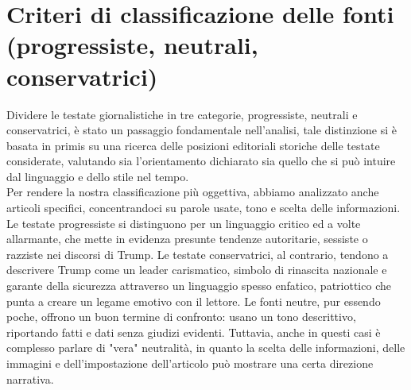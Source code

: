 \section{Criteri di classificazione delle fonti (progressiste, neutrali, conservatrici)}
Dividere le testate giornalistiche in tre categorie, progressiste, neutrali e conservatrici, è stato un passaggio fondamentale nell’analisi, tale distinzione si è basata in primis su una ricerca delle posizioni editoriali storiche delle testate considerate, valutando sia l’orientamento dichiarato sia quello che si può intuire dal linguaggio e dello stile nel tempo. \\
Per rendere la nostra classificazione più oggettiva, abbiamo analizzato anche articoli specifici, concentrandoci su parole usate, tono e scelta delle informazioni.\\
Le testate progressiste si distinguono per un linguaggio critico ed a volte allarmante, che mette in evidenza presunte tendenze autoritarie, sessiste o razziste nei discorsi di Trump. Le testate conservatrici, al contrario, tendono a descrivere Trump come un leader carismatico, simbolo di rinascita nazionale e garante della sicurezza attraverso un linguaggio spesso enfatico, patriottico che punta a creare un legame emotivo con il lettore. Le fonti neutre, pur essendo poche, offrono un buon termine di confronto: usano un tono descrittivo, riportando fatti e dati senza giudizi evidenti. Tuttavia, anche in questi casi è complesso parlare di "vera" neutralità, in quanto la scelta delle informazioni, delle immagini e dell’impostazione dell’articolo può mostrare una certa direzione narrativa.

